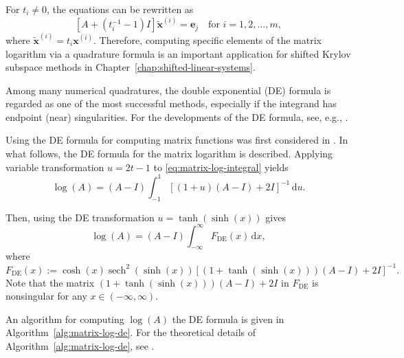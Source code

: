 {For $t_i\ne0$, the equations can be rewritten as}
\begin{equation}\label{eq:matrix-log-shifted-systems}[A+(t_i^{-1}-1)I]\widetilde{\boldsymbol{x}}^{(i)}=\boldsymbol{e}_j\quad\text{for }i=1,2,\ldots,m,\end{equation}
{where $\widetilde{\boldsymbol{x}}^{(i)}=t_i\boldsymbol{x}^{(i)}$. Therefore, computing specific elements of the matrix logarithm via a quadrature formula is an important application for shifted Krylov subspace methods in Chapter~\ref{chap:shifted-linear-systems}.}

{Among many numerical quadratures, the double exponential (DE) formula  is regarded as one of the most successful methods, especially if the integrand has endpoint (near) singularities. For the developments of the DE formula, see, e.g., .}

{Using the DE formula for computing matrix functions was first considered in . In what follows, the DE formula for the matrix logarithm is described. Applying variable transformation $u=2t-1$ to \eqref{eq:matrix-log-integral} yields}
\begin{equation}\label{eq:matrix-log-symmetric-integral}\log(A)=(A-I)\int_{-1}^1[(1+u)(A-I)+2I]^{-1}\,\mathrm{d}u.\end{equation}

{Then, using the DE transformation $u=\tanh(\sinh(x))$ gives}
\begin{equation}\label{eq:matrix-log-de-integral}\log(A)=(A-I)\int_{-\infty}^{\infty}F_{\mathrm{DE}}(x)\,\mathrm{d}x,\end{equation}
{where}
\begin{equation}\label{eq:matrix-log-de-integrand}F_{\mathrm{DE}}(x):=\cosh(x)\operatorname{sech}^2(\sinh(x))[(1+\tanh(\sinh(x)))(A-I)+2I]^{-1}.\end{equation}
{Note that the matrix $(1+\tanh(\sinh(x)))(A-I)+2I$ in $F_{\mathrm{DE}}$ is nonsingular for any $x\in(-\infty,\infty)$.}

{An algorithm for computing $\log(A)$ the DE formula is given in Algorithm~\ref{alg:matrix-log-de}. For the theoretical details of Algorithm~\ref{alg:matrix-log-de}, see .}

